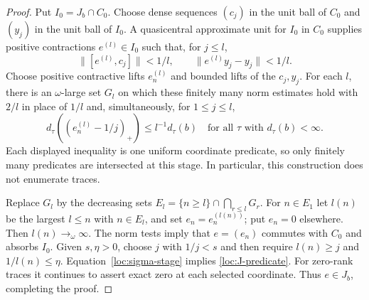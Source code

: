 \begin{proof}
Put $I_0=J_b\cap C_0$.  Choose dense sequences $(c_j)$ in the unit ball
of $C_0$ and $(y_j)$ in the unit ball of $I_0$.  A quasicentral
approximate unit for $I_0$ in $C_0$ supplies positive contractions
$e^{(l)}\in I_0$ such that, for $j\le l$,
\[
 \|[e^{(l)},c_j]\|<1/l,\qquad
 \|e^{(l)}y_j-y_j\|<1/l.
\]
Choose positive contractive lifts $e^{(l)}_n$ and bounded lifts of the
$c_j,y_j$.  For each $l$, there is an $\omega$-large set $G_l$ on
which these finitely many norm estimates hold with $2/l$ in place of
$1/l$ and, simultaneously, for $1\le j\le l$,
\begin{equation}\label{loc:sigma-stage}
 d_\tau((e^{(l)}_n-1/j)_+)\le l^{-1}d_\tau(b)
       \quad\text{for all }\tau\text{ with }d_\tau(b)<\infty.
\end{equation}
Each displayed inequality is one uniform coordinate predicate, so
only finitely many predicates are intersected at this stage.  In
particular, this construction does not enumerate traces.

Replace $G_l$ by the decreasing sets
$E_l=\{n\ge l\}\cap\bigcap_{r\le l}G_r$.
For $n\in E_1$ let $l(n)$ be the largest $l\le n$ with $n\in E_l$,
and set $e_n=e^{(l(n))}_n$; put $e_n=0$ elsewhere.  Then
$l(n)\to_\omega\infty$.  The norm tests imply that $e=(e_n)$
commutes with $C_0$ and absorbs $I_0$.  Given $s,\eta>0$, choose
$j$ with $1/j<s$ and then require $l(n)\ge j$ and $1/l(n)\le\eta$.
Equation~\eqref{loc:sigma-stage} implies
\eqref{loc:J-predicate}.  For zero-rank traces it continues to assert
exact zero at each selected coordinate.  Thus $e\in J_b$, completing
the proof.
\end{proof}

